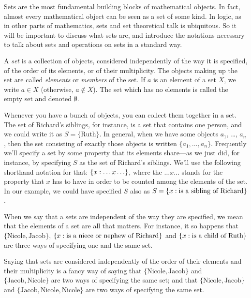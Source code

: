 \documentclass[open-logic-section]{subfiles}
\begin{document}

\begin{wordy}
Sets are the most fundamental building blocks of mathematical
objects. In fact, almost every mathematical object can be seen as a
set of some kind.  In logic, as in other parts of mathematics, sets
and set theoretical talk is ubiquitous.  So it will be important to
discuss what sets are, and introduce the notations necessary to talk
about sets and operations on sets in a standard way.
\end{wordy}

\begin{defn}
A \emph{set} is a collection of objects, considered independently of
the way it is specified, of the order of its elements, or of their
multiplicity. The objects making up the set are called \emph{elements}
or \emph{members} of the set. If $a$ is an element of a set $X$, we
write $a \in X$ (otherwise, $a \notin X$). The set which has no elements
is called the empty set and denoted $\emptyset$.
\end{defn}

\begin{ex}
Whenever you have a bunch of objects, you can collect them together in
a set. The set of Richard's siblings, for instance, is a set that
contains one person, and we could write it as $S=\{\textrm{Ruth}\}$.
In general, when we have some objects $a_{1}$, \dots, $a_{n}$, then
the set consisting of exactly those objects is written $\{
a_{1},\ldots,a_{n}\}$.  Frequently we'll specify a set by some
property that its elements share---as we just did, for instance, by
specifying $S$ as the set of Richard's siblings. We'll use the
following shorthand notation for that: $\{ x : \ldots x\ldots \}$,
where the $\ldots x\ldots$ stands for the property that $x$ has to
have in order to be counted among the elements of the set. In our
example, we could have specified $S$ also as $S = \{ x : \text{is
a sibling of Richard} \}$. 
\end{ex}

\begin{wordy}
When we say that a sets are independent of the way they are specified,
we mean that the elements of a set are all that matters. For instance,
it so happens that $\{\text{Nicole}, \text{Jacob}\}$,
$\{ x : \text{is a niece or nephew of Richard} \}$ and
$\{ x : \text{is a child of Ruth} \}$ are three ways of specifying
one and the same set.

Saying that sets are considered independently of the order of their
elements and their multiplicity is a fancy way of saying that
$\{\text{Nicole}, \text{Jacob}\}$ and $\{\text{Jacob},
\text{Nicole}\}$ are two ways of specifying the same set; and that
$\{\text{Nicole}, \text{Jacob}\}$ and $\{\text{Jacob}, \text{Nicole},
\text{Nicole}\}$ are two ways of specifying the same set.
\end{wordy}
\end{document}
